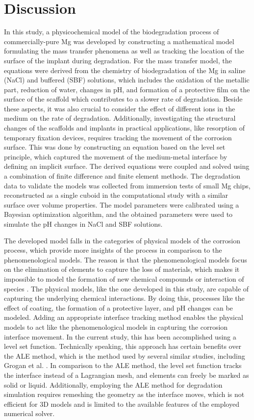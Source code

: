 \section{Discussion}

In this study, a physicochemical model of the biodegradation process of commercially-pure Mg was developed by constructing a mathematical model formulating the mass transfer phenomena as well as tracking the location of the surface of the implant during degradation. For the mass transfer model, the equations were derived from the chemistry of biodegradation of the Mg in saline (NaCl) and buffered (SBF) solutions, which includes the oxidation of the metallic part, reduction of water, changes in pH, and formation of a protective film on the surface of the scaffold which contributes to a slower rate of degradation. Beside these aspects, it was also crucial to consider the effect of different ions in the medium on the rate of degradation. Additionally, investigating the structural changes of the scaffolds and implants in practical applications, like resorption of temporary fixation devices, requires tracking the movement of the corrosion surface. This was done by constructing an equation based on the level set principle, which captured the movement of the medium-metal interface by defining an implicit surface. The derived equations were coupled and solved using a combination of finite difference and finite element methods. The degradation data to validate the models was collected from immersion tests of small Mg chips, reconstructed as a single cuboid in the computational study with a similar surface over volume properties. The model parameters were calibrated using a Bayesian optimization algorithm, and the obtained parameters were used to simulate the pH changes in NaCl and SBF solutions.

The developed model falls in the categories of physical models of the corrosion process, which provide more insights of the process in comparison to the phenomenological models. The reason is that the phenomenological models focus on the elimination of elements to capture the loss of materials, which makes it impossible to model the formation of new chemical compounds or interaction of species \cite{Abdalla2020}. The physical models, like the one developed in this study, are capable of capturing the underlying chemical interactions. By doing this, processes like the effect of coating, the formation of a protective layer, and pH changes can be modeled. Adding an appropriate interface tracking method enables the physical models to act like the phenomenological models in capturing the corrosion interface movement. In the current study, this has been accomplished using a level set function. Technically speaking, this approach has certain benefits over the  ALE method,  which is the method used by several similar studies, including Grogan et al. \cite{Grogan2014}. In comparison to the ALE method, the level set function tracks the interface instead of a Lagrangian mesh, and elements can freely be marked as solid or liquid. Additionally, employing the ALE method for degradation simulation requires remeshing the geometry as the interface moves, which is not efficient for 3D models and is limited to the available features of the employed numerical solver.

